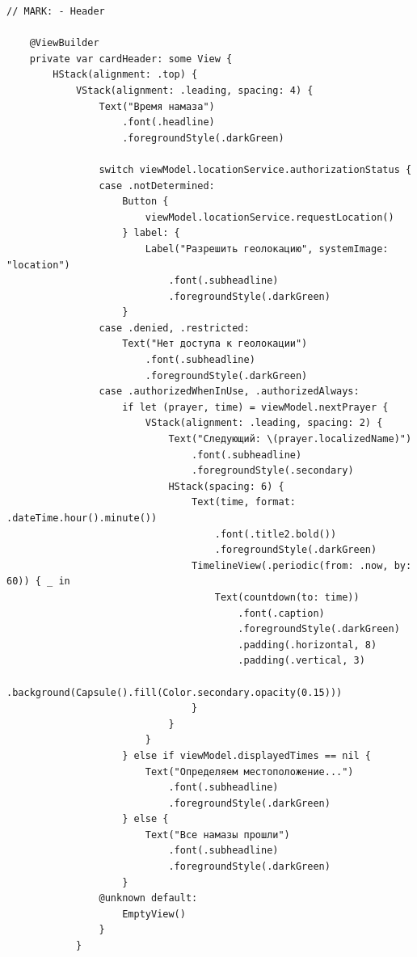\begin{lstlisting}[basicstyle=\tiny\ttfamily,breaklines=true]
    // MARK: - Header

    @ViewBuilder
    private var cardHeader: some View {
        HStack(alignment: .top) {
            VStack(alignment: .leading, spacing: 4) {
                Text("Время намаза")
                    .font(.headline)
                    .foregroundStyle(.darkGreen)

                switch viewModel.locationService.authorizationStatus {
                case .notDetermined:
                    Button {
                        viewModel.locationService.requestLocation()
                    } label: {
                        Label("Разрешить геолокацию", systemImage: "location")
                            .font(.subheadline)
                            .foregroundStyle(.darkGreen)
                    }
                case .denied, .restricted:
                    Text("Нет доступа к геолокации")
                        .font(.subheadline)
                        .foregroundStyle(.darkGreen)
                case .authorizedWhenInUse, .authorizedAlways:
                    if let (prayer, time) = viewModel.nextPrayer {
                        VStack(alignment: .leading, spacing: 2) {
                            Text("Следующий: \(prayer.localizedName)")
                                .font(.subheadline)
                                .foregroundStyle(.secondary)
                            HStack(spacing: 6) {
                                Text(time, format: .dateTime.hour().minute())
                                    .font(.title2.bold())
                                    .foregroundStyle(.darkGreen)
                                TimelineView(.periodic(from: .now, by: 60)) { _ in
                                    Text(countdown(to: time))
                                        .font(.caption)
                                        .foregroundStyle(.darkGreen)
                                        .padding(.horizontal, 8)
                                        .padding(.vertical, 3)
                                        .background(Capsule().fill(Color.secondary.opacity(0.15)))
                                }
                            }
                        }
                    } else if viewModel.displayedTimes == nil {
                        Text("Определяем местоположение...")
                            .font(.subheadline)
                            .foregroundStyle(.darkGreen)
                    } else {
                        Text("Все намазы прошли")
                            .font(.subheadline)
                            .foregroundStyle(.darkGreen)
                    }
                @unknown default:
                    EmptyView()
                }
            }


\end{lstlisting}
